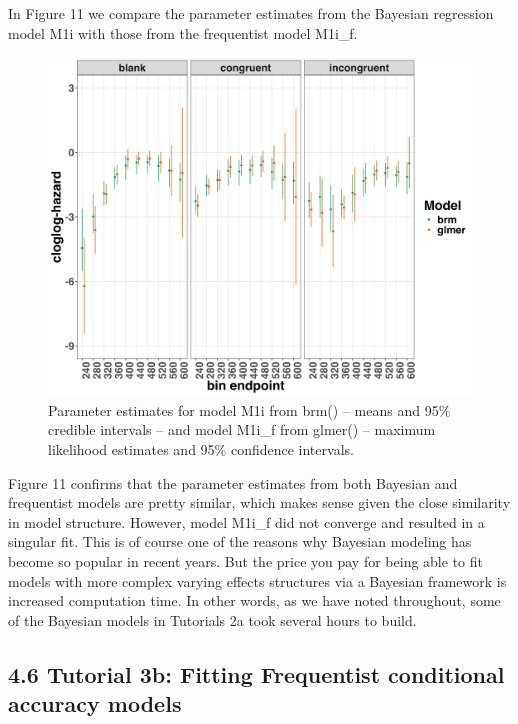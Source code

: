 \documentclass[
  man, donotrepeattitle,floatsintext]{apa6}
\begin{document}
In Figure 11 we compare the parameter estimates from the Bayesian regression model M1i with those from the frequentist model M1i\_f.



\begin{figure}[H]

{\centering \includegraphics[width=0.8\linewidth,height=0.67\textheight,]{../Tutorial_3_Frequentist/comparison} 

}

\caption{Parameter estimates for model M1i from brm() -- means and 95\% credible intervals -- and model M1i\_f from glmer() -- maximum likelihood estimates and 95\% confidence intervals.}\label{fig:plot-comparison}
\end{figure}

Figure 11 confirms that the parameter estimates from both Bayesian and frequentist models are pretty similar, which makes sense given the close similarity in model structure. However, model M1i\_f did not converge and resulted in a singular fit. This is of course one of the reasons why Bayesian modeling has become so popular in recent years. But the price you pay for being able to fit models with more complex varying effects structures via a Bayesian framework is increased computation time. In other words, as we have noted throughout, some of the Bayesian models in Tutorials 2a took several hours to build.

\subsection{4.6 Tutorial 3b: Fitting Frequentist conditional accuracy models}\label{tutorial-3b-fitting-frequentist-conditional-accuracy-models}
\end{document}
